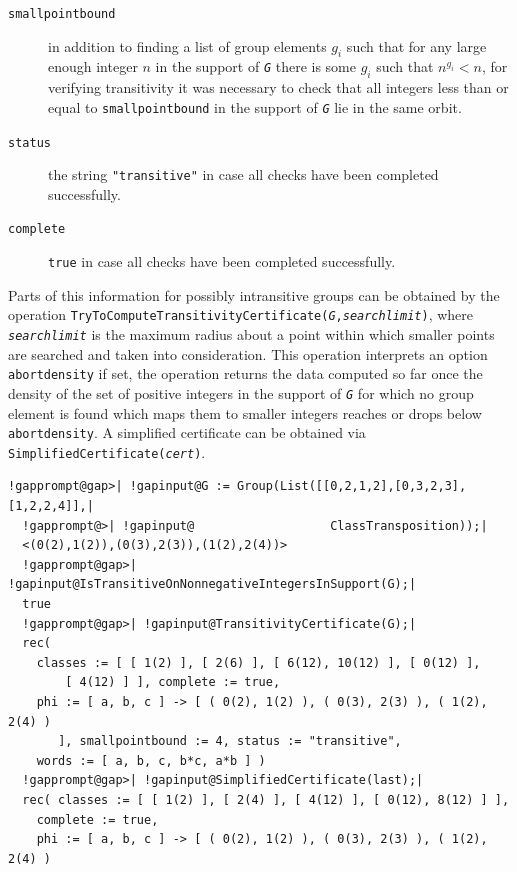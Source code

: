\documentclass[a4paper,11pt]{report}
\begin{document}
{{\begin{description}
\item[{\texttt{smallpointbound}}]  in addition to finding a list of group elements $g_i$ such that for any large enough integer $n$ in the support of \mbox{\texttt{\mdseries\slshape G}} there is some $g_i$ such that $n^{g_i} < n$, for verifying transitivity it was necessary to check that all integers less
than or equal to \texttt{smallpointbound} in the support of \mbox{\texttt{\mdseries\slshape G}} lie in the same orbit. 
\item[{\texttt{status}}]  the string \texttt{"transitive"} in case all checks have been completed successfully. 
\item[{\texttt{complete}}]  \texttt{true} in case all checks have been completed successfully. 
\end{description}
 Parts of this information for possibly intransitive groups can be obtained by
the operation \texttt{TryToComputeTransitivityCertificate(\mbox{\texttt{\mdseries\slshape G}},\mbox{\texttt{\mdseries\slshape searchlimit}})}, where \mbox{\texttt{\mdseries\slshape searchlimit}} is the maximum radius about a point within which smaller points are searched
and taken into consideration. This operation interprets an option \texttt{abortdensity} \texttt{}\texttt{} if set, the operation returns the
data computed so far once the density of the set of positive integers in the
support of \mbox{\texttt{\mdseries\slshape G}} for which no group element is found which maps them to smaller integers
reaches or drops below \texttt{abortdensity}. A simplified certificate can be obtained via \texttt{SimplifiedCertificate(\mbox{\texttt{\mdseries\slshape cert}})}. 
\begin{Verbatim}[commandchars=!@|,fontsize=\small,frame=single,label=Example]
  !gapprompt@gap>| !gapinput@G := Group(List([[0,2,1,2],[0,3,2,3],[1,2,2,4]],|
  !gapprompt@>| !gapinput@                   ClassTransposition));|
  <(0(2),1(2)),(0(3),2(3)),(1(2),2(4))>
  !gapprompt@gap>| !gapinput@IsTransitiveOnNonnegativeIntegersInSupport(G);|
  true
  !gapprompt@gap>| !gapinput@TransitivityCertificate(G);|
  rec( 
    classes := [ [ 1(2) ], [ 2(6) ], [ 6(12), 10(12) ], [ 0(12) ], 
        [ 4(12) ] ], complete := true, 
    phi := [ a, b, c ] -> [ ( 0(2), 1(2) ), ( 0(3), 2(3) ), ( 1(2), 2(4) ) 
       ], smallpointbound := 4, status := "transitive", 
    words := [ a, b, c, b*c, a*b ] )
  !gapprompt@gap>| !gapinput@SimplifiedCertificate(last);|
  rec( classes := [ [ 1(2) ], [ 2(4) ], [ 4(12) ], [ 0(12), 8(12) ] ], 
    complete := true, 
    phi := [ a, b, c ] -> [ ( 0(2), 1(2) ), ( 0(3), 2(3) ), ( 1(2), 2(4) ) 

\end{Verbatim}}}
\end{document}
